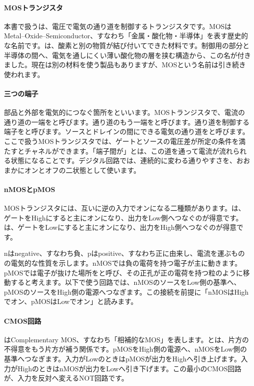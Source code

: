 \paragraph{MOSトランジスタ}
        本書で扱うは、電圧で電気の通り道を制御するトランジスタです。MOSはMetal--Oxide--Semiconductor、すなわち「金属・酸化物・半導体」を表す歴史的な名前です。は、酸素と別の物質が結び付いてできた材料です。制御用の部分と半導体の間へ、電気を通しにくい薄い酸化物の層を挟む構造から、この名が付きました。現在は別の材料を使う製品もありますが、MOSという名前は引き続き使われます。

\paragraph{三つの端子}
        部品と外部を電気的につなぐ箇所をといいます。MOSトランジスタで、電流の通り道の一端をと呼びます。通り道のもう一端をと呼びます。通り道を制御する端子をと呼びます。ソースとドレインの間にできる電気の通り道をと呼びます。ここで扱うMOSトランジスタでは、ゲートとソースの電圧差が所定の条件を満たすとチャネルができます。「端子間が」とは、この道を通って電流が流れられる状態になることです。デジタル回路では、連続的に変わる通りやすさを、おおまかにオンとオフの二状態として使います。

\paragraph{nMOSとpMOS}
        MOSトランジスタには、互いに逆の入力でオンになる二種類があります。は、ゲートをHighにすると主にオンになり、出力をLow側へつなぐのが得意です。は、ゲートをLowにすると主にオンになり、出力をHigh側へつなぐのが得意です。

        nはnegative、すなわち負、pはpositive、すなわち正に由来し、電流を運ぶものの電気的な性質を示します。nMOSでは負の電荷を持つ電子が主に動きます。pMOSでは電子が抜けた場所をと呼び、その正孔が正の電荷を持つ粒のように移動すると考えます。以下で使う回路では、nMOSのソースをLow側の基準へ、pMOSのソースをHigh側の電源へつなぎます。この接続を前提に「nMOSはHighでオン、pMOSはLowでオン」と読みます。

\par
\endgroup
\medskip
\begingroup
      \centering
      \vspace{1mm}
\paragraph{CMOS回路}
        はComplementary MOS、すなわち「相補的なMOS」を表します。とは、片方の不得意をもう片方が補う関係です。pMOSをHigh側の電源へ、nMOSをLow側の基準へつなぎます。入力がLowのときはpMOSが出力をHighへ引き上げます。入力がHighのときはnMOSが出力をLowへ引き下げます。この最小のCMOS回路が、入力を反対へ変えるNOT回路です。

